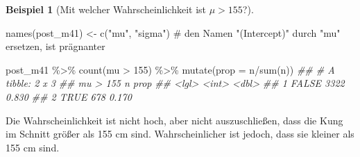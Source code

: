 \documentclass[
  a4paper,
  DIV=11]{scrreprt}
\newenvironment{Shaded}{\begin{snugshade}}{\end{snugshade}}
\newcommand{\AttributeTok}[1]{\textcolor[rgb]{0.40,0.45,0.13}{#1}}
\newcommand{\CommentTok}[1]{\textcolor[rgb]{0.37,0.37,0.37}{#1}}
\newcommand{\DecValTok}[1]{\textcolor[rgb]{0.68,0.00,0.00}{#1}}
\newcommand{\DocumentationTok}[1]{\textcolor[rgb]{0.37,0.37,0.37}{\textit{#1}}}
\newcommand{\FunctionTok}[1]{\textcolor[rgb]{0.28,0.35,0.67}{#1}}
\newcommand{\NormalTok}[1]{\textcolor[rgb]{0.00,0.23,0.31}{#1}}
\newcommand{\OtherTok}[1]{\textcolor[rgb]{0.00,0.23,0.31}{#1}}
\newcommand{\SpecialCharTok}[1]{\textcolor[rgb]{0.37,0.37,0.37}{#1}}
\newcommand{\StringTok}[1]{\textcolor[rgb]{0.13,0.47,0.30}{#1}}
\theoremstyle{definition}
\newtheorem{example}{Beispiel}[chapter]
\theoremstyle{remark}
\begin{document}
\leavevmode{}%
\begin{example}[Mit welcher Wahrscheinlichkeit ist
\(\mu>155\)?]\label{exm-kung1}

\begin{Shaded}
\begin{Highlighting}[]
\FunctionTok{names}\NormalTok{(post\_m41) }\OtherTok{\textless{}{-}} 
  \FunctionTok{c}\NormalTok{(}\StringTok{"mu"}\NormalTok{, }\StringTok{"sigma"}\NormalTok{)  }\CommentTok{\# den Namen "(Intercept)" durch "mu" ersetzen, ist prägnanter}

\NormalTok{post\_m41 }\SpecialCharTok{\%\textgreater{}\%} 
  \FunctionTok{count}\NormalTok{(mu }\SpecialCharTok{\textgreater{}} \DecValTok{155}\NormalTok{) }\SpecialCharTok{\%\textgreater{}\%} 
  \FunctionTok{mutate}\NormalTok{(}\AttributeTok{prop =}\NormalTok{ n}\SpecialCharTok{/}\FunctionTok{sum}\NormalTok{(n))}
\DocumentationTok{\#\# \# A tibble: 2 x 3}
\DocumentationTok{\#\#   \textasciigrave{}mu \textgreater{} 155\textasciigrave{}     n  prop}
\DocumentationTok{\#\#   \textless{}lgl\textgreater{}      \textless{}int\textgreater{} \textless{}dbl\textgreater{}}
\DocumentationTok{\#\# 1 FALSE       3322 0.830}
\DocumentationTok{\#\# 2 TRUE         678 0.170}
\end{Highlighting}
\end{Shaded}

Die Wahrscheinlichkeit ist nicht hoch, aber nicht auszuschließen, dass
die Kung im Schnitt größer als 155 cm sind. Wahrscheinlicher ist jedoch,
dass sie kleiner als 155 cm sind.

\end{example}
\end{document}
